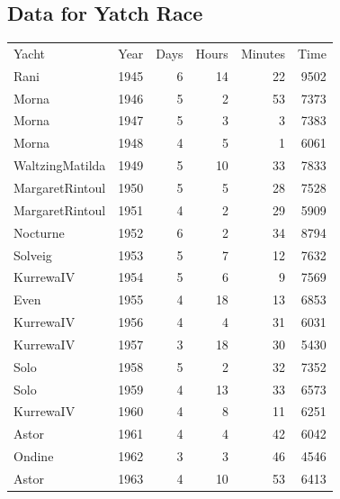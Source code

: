 \documentclass[11pt]{article}
\begin{document}
\subsection{Data for Yatch Race}
\label{sec-3-1}


\begin{center}
\begin{tabular}{lrrrrr}
 Yacht                &  Year  &  Days  &  Hours  &  Minutes  &    Time  \\
 Rani                 &  1945  &     6  &     14  &       22  &    9502  \\
 Morna                &  1946  &     5  &      2  &       53  &    7373  \\
 Morna                &  1947  &     5  &      3  &        3  &    7383  \\
 Morna                &  1948  &     4  &      5  &        1  &    6061  \\
 WaltzingMatilda      &  1949  &     5  &     10  &       33  &    7833  \\
 MargaretRintoul      &  1950  &     5  &      5  &       28  &    7528  \\
 MargaretRintoul      &  1951  &     4  &      2  &       29  &    5909  \\
 Nocturne             &  1952  &     6  &      2  &       34  &    8794  \\
 Solveig              &  1953  &     5  &      7  &       12  &    7632  \\
 KurrewaIV            &  1954  &     5  &      6  &        9  &    7569  \\
 Even                 &  1955  &     4  &     18  &       13  &    6853  \\
 KurrewaIV            &  1956  &     4  &      4  &       31  &    6031  \\
 KurrewaIV            &  1957  &     3  &     18  &       30  &    5430  \\
 Solo                 &  1958  &     5  &      2  &       32  &    7352  \\
 Solo                 &  1959  &     4  &     13  &       33  &    6573  \\
 KurrewaIV            &  1960  &     4  &      8  &       11  &    6251  \\
 Astor                &  1961  &     4  &      4  &       42  &    6042  \\
 Ondine               &  1962  &     3  &      3  &       46  &    4546  \\
 Astor                &  1963  &     4  &     10  &       53  &    6413  \\

\end{tabular}
\end{center}
\end{document}

